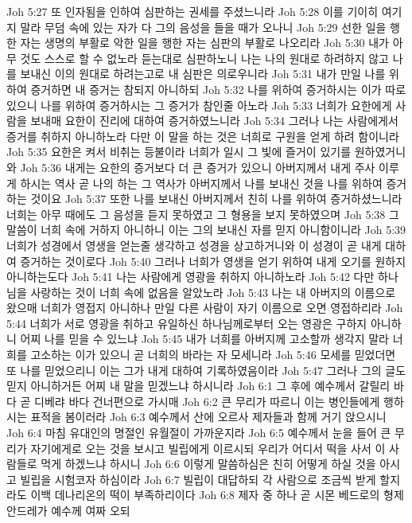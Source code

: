 Joh 5:27  또 인자됨을 인하여 심판하는 권세를 주셨느니라
Joh 5:28  이를 기이히 여기지 말라 무덤 속에 있는 자가 다 그의 음성을 들을 때가 오나니
Joh 5:29  선한 일을 행한 자는 생명의 부활로 악한 일을 행한 자는 심판의 부활로 나오리라
Joh 5:30  내가 아무 것도 스스로 할 수 없노라 듣는대로 심판하노니 나는 나의 원대로 하려하지 않고 나를 보내신 이의 원대로 하려는고로 내 심판은 의로우니라
Joh 5:31  내가 만일 나를 위하여 증거하면 내 증거는 참되지 아니하되
Joh 5:32  나를 위하여 증거하시는 이가 따로 있으니 나를 위하여 증거하시는 그 증거가 참인줄 아노라
Joh 5:33  너희가 요한에게 사람을 보내매 요한이 진리에 대하여 증거하였느니라
Joh 5:34  그러나 나는 사람에게서 증거를 취하지 아니하노라 다만 이 말을 하는 것은 너희로 구원을 얻게 하려 함이니라
Joh 5:35  요한은 켜서 비취는 등불이라 너희가 일시 그 빛에 즐거이 있기를 원하였거니와
Joh 5:36  내게는 요한의 증거보다 더 큰 증거가 있으니 아버지께서 내게 주사 이루게 하시는 역사 곧 나의 하는 그 역사가 아버지께서 나를 보내신 것을 나를 위하여 증거하는 것이요
Joh 5:37  또한 나를 보내신 아버지께서 친히 나를 위하여 증거하셨느니라 너희는 아무 때에도 그 음성을 듣지 못하였고 그 형용을 보지 못하였으며
Joh 5:38  그 말씀이 너희 속에 거하지 아니하니 이는 그의 보내신 자를 믿지 아니함이니라
Joh 5:39  너희가 성경에서 영생을 얻는줄 생각하고 성경을 상고하거니와 이 성경이 곧 내게 대하여 증거하는 것이로다
Joh 5:40  그러나 너희가 영생을 얻기 위하여 내게 오기를 원하지 아니하는도다
Joh 5:41  나는 사람에게 영광을 취하지 아니하노라
Joh 5:42  다만 하나님을 사랑하는 것이 너희 속에 없음을 알았노라
Joh 5:43  나는 내 아버지의 이름으로 왔으매 너희가 영접지 아니하나 만일 다른 사람이 자기 이름으로 오면 영접하리라
Joh 5:44  너희가 서로 영광을 취하고 유일하신 하나님께로부터 오는 영광은 구하지 아니하니 어찌 나를 믿을 수 있느냐
Joh 5:45  내가 너희를 아버지께 고소할까 생각지 말라 너희를 고소하는 이가 있으니 곧 너희의 바라는 자 모세니라
Joh 5:46  모세를 믿었더면 또 나를 믿었으리니 이는 그가 내게 대하여 기록하였음이라
Joh 5:47  그러나 그의 글도 믿지 아니하거든 어찌 내 말을 믿겠느냐 하시니라
Joh 6:1  그 후에 예수께서 갈릴리 바다 곧 디베랴 바다 건너편으로 가시매
Joh 6:2  큰 무리가 따르니 이는 병인들에게 행하시는 표적을 봄이러라
Joh 6:3  예수께서 산에 오르사 제자들과 함께 거기 앉으시니
Joh 6:4  마침 유대인의 명절인 유월절이 가까운지라
Joh 6:5  예수께서 눈을 들어 큰 무리가 자기에게로 오는 것을 보시고 빌립에게 이르시되 우리가 어디서 떡을 사서 이 사람들로 먹게 하겠느냐 하시니
Joh 6:6  이렇게 말씀하심은 친히 어떻게 하실 것을 아시고 빌립을 시험코자 하심이라
Joh 6:7  빌립이 대답하되 각 사람으로 조금씩 받게 할지라도 이백 데나리온의 떡이 부족하리이다
Joh 6:8  제자 중 하나 곧 시몬 베드로의 형제 안드레가 예수께 여짜 오되
